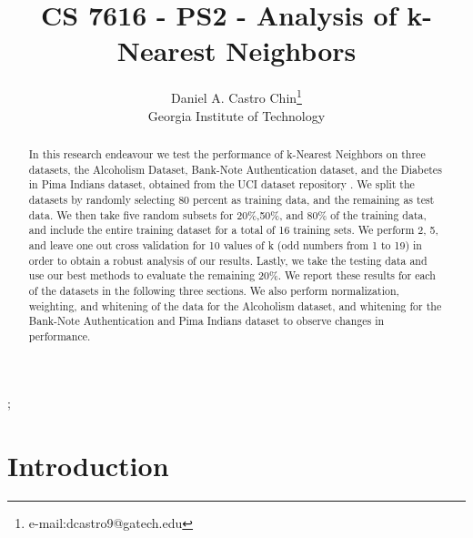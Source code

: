 \documentclass[conference]{acmsiggraph}
\title{CS 7616 - PS2 - Analysis of k-Nearest Neighbors}
\author{Daniel A. Castro Chin\thanks{e-mail:dcastro9@gatech.edu}\\Georgia Institute of Technology}
\begin{document}

\maketitle

\begin{abstract}

In this research endeavour we test the performance of k-Nearest Neighbors on three datasets, the Alcoholism Dataset, Bank-Note Authentication dataset, and the Diabetes in Pima Indians dataset, obtained from the UCI dataset repository \cite{Bache+Lichman:2013}. We split the datasets by randomly selecting 80 percent as training data, and the remaining as test data. We then take five random subsets for 20\%,50\%, and 80\% of the training data, and include the entire training dataset for a total of 16 training sets. We perform 2, 5, and leave one out cross validation for 10 values of k (odd numbers from 1 to 19) in order to obtain a robust analysis of our results. Lastly, we take the testing data and use our best methods to evaluate the remaining 20\%. We report these results for each of the datasets in the following three sections. We also perform normalization, weighting, and whitening of the data for the Alcoholism dataset, and whitening for the Bank-Note Authentication and Pima Indians dataset to observe changes in performance.

\end{abstract}

\begin{CRcatlist}
  ;
\end{CRcatlist}

\keywordlist


\TOGlinkslist


\copyrightspace

\section{Introduction}
\end{document}
